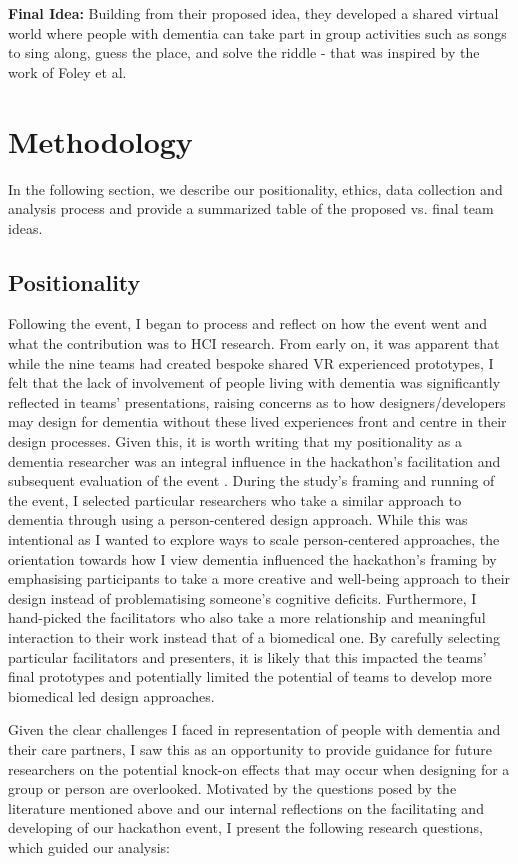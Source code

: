 \textbf{Final Idea:} Building from their proposed idea, they developed a shared virtual world where people with dementia can take part in group activities such as songs to sing along, guess the place, and solve the riddle - that was inspired by the work of Foley et al. \citep{foley_printer_2019}

\section{Methodology}
\label{sec:methodology}
In the following section, we describe our positionality, ethics, data collection and analysis process and provide a summarized table of the proposed vs. final team ideas.

\subsection{Positionality}
\label{method:positionality}
Following the event, I began to process and reflect on how the event went and what the contribution was to HCI research. From early on, it was apparent that while the nine teams had created bespoke shared VR experienced prototypes, I felt that the lack of involvement of people living with dementia was significantly reflected in teams' presentations, raising concerns as to how designers/developers may design for dementia without these lived experiences front and centre in their design processes. Given this, it is worth writing that my positionality as a dementia researcher was an integral influence in the hackathon's facilitation and subsequent evaluation of the event \citep{bourke_positionality_2014}. During the study's framing and running of the event, I selected particular researchers who take a similar approach to dementia through using a person-centered design approach. While this was intentional as I wanted to explore ways to scale person-centered approaches, the orientation towards how I view dementia influenced the hackathon's framing by emphasising participants to take a more creative and well-being approach to their design instead of problematising someone's cognitive deficits. Furthermore, I hand-picked the facilitators who also take a more relationship and meaningful interaction to their work instead that of a biomedical one. By carefully selecting particular facilitators and presenters, it is likely that this impacted the teams' final prototypes and potentially limited the potential of teams to develop more biomedical led design approaches. 

Given the clear challenges I faced in representation of people with dementia and their care partners, I saw this as an opportunity to provide guidance for future researchers on the potential knock-on effects that may occur when designing for a group or person are overlooked. Motivated by the questions posed by the literature mentioned above and our internal reflections on the facilitating and developing of our hackathon event, I present the following research questions, which guided our analysis:

